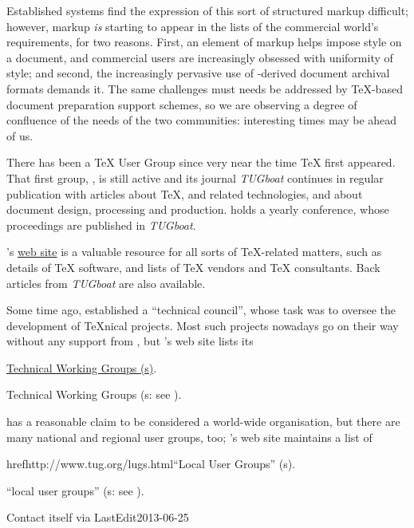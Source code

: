 Established \WYSIWYG{} systems find the expression of this sort of
structured markup difficult; however, markup \emph{is} starting to
appear in the lists of the commercial world's requirements, for two
reasons.  First, an element of markup helps impose style on a
document, and commercial users are increasingly obsessed with
uniformity of style; and second, the increasingly pervasive use of
-derived document archival formats demands it.  The same
challenges must needs be addressed by \TeX{}-based document
preparation support schemes, so we are
observing a degree of confluence of the needs of the two communities:
interesting times may be ahead of us.


There has been a \TeX{} User Group since very near the time \TeX{}
first appeared.  That first group, , is still active and its
journal \textsl{TUGboat} continues in regular publication
with articles about \TeX{}, \MF{} and related technologies, and about
document design, processing and production.   holds a yearly
conference, whose proceedings are published in \textsl{TUGboat}.

's \href{http://www.tug.org}{web site} is a valuable
resource for all sorts of
\TeX{}-related matters, such as details of \TeX{} software, and lists
of \TeX{} vendors and \TeX{} consultants.  Back articles from
\textsl{TUGboat} are also available.

Some time ago,  established a ``technical council'', whose
task was to oversee the development of \TeX{}nical projects.  Most
such projects nowadays go on their way without any support from
, but 's web site lists its

\begin{hyperversion}
\href{http://www.tug.org/twg.html}{Technical Working Groups (s)}.
\end{hyperversion}
\begin{flatversion}
Technical Working Groups (s: see
).
\end{flatversion}

 has a reasonable claim to be considered a world-wide
organisation, but there are many national and regional user groups,
too; 's web site maintains a list of
\begin{hyperversion}
href{http://www.tug.org/lugs.html}{``Local User Groups'' (s)}.
\end{hyperversion}
\begin{flatversion}
``local user groups'' (s: see
).
\end{flatversion}

Contact  itself via 
LastEdit{2013-06-25}
